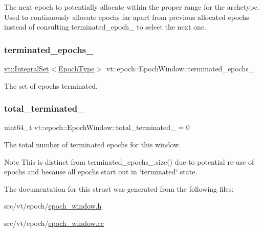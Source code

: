 The next epoch to potentially allocate within the proper range for the archetype. Used to continuously allocate epochs far apart from previous allocated epochs instead of consulting {\ttfamily terminated\+\_\+epoch\+\_\+} to select the next one. \mbox{\label{structvt_1_1epoch_1_1_epoch_window_ae660a6b6db0f1a90d0922f6c29f0dd28}} 
\subsubsection{\texorpdfstring{terminated\+\_\+epochs\+\_\+}{terminated\_epochs\_}}
{\footnotesize\ttfamily \hyperlink{namespacevt_af8fc7210a3d8e598330cf3375857ef1e}{vt\+::\+Integral\+Set}$<$\hyperlink{namespacevt_a985a5adf291c34a3ca263b3378388236}{Epoch\+Type}$>$ vt\+::epoch\+::\+Epoch\+Window\+::terminated\+\_\+epochs\+\_\+\hspace{0.3cm}{\ttfamily [private]}}



The set of epochs terminated. 

\mbox{\label{structvt_1_1epoch_1_1_epoch_window_a2c33b5bc9f0228eccd15b3788c4b1022}} 
\subsubsection{\texorpdfstring{total\+\_\+terminated\+\_\+}{total\_terminated\_}}
{\footnotesize\ttfamily uint64\+\_\+t vt\+::epoch\+::\+Epoch\+Window\+::total\+\_\+terminated\+\_\+ = 0\hspace{0.3cm}{\ttfamily [private]}}

The total number of terminated epochs for this window.

\begin{DoxyNote}{Note}
This is distinct from terminated\+\_\+epochs\+\_\+.\+size() due to potential re-\/use of epochs and because all epochs start out in \char`\"{}terminated\char`\"{} state. 
\end{DoxyNote}


The documentation for this struct was generated from the following files\+:\begin{DoxyCompactItemize}
\item 
src/vt/epoch/\hyperlink{epoch__window_8h}{epoch\+\_\+window.\+h}\item 
src/vt/epoch/\hyperlink{epoch__window_8cc}{epoch\+\_\+window.\+cc}\end{DoxyCompactItemize}
